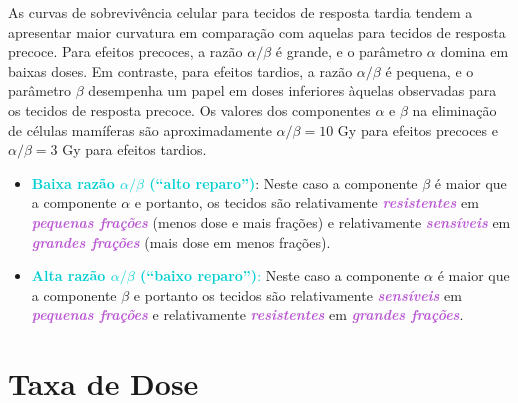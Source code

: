 \documentclass[11pt,a4paper]{article}
\begin{document}
	As curvas de sobrevivência celular para tecidos de resposta tardia tendem a apresentar maior curvatura em comparação com aquelas para tecidos de resposta precoce. Para efeitos precoces, a razão $\alpha/\beta$ é grande, e o parâmetro $\alpha$ domina em baixas doses. Em contraste, para efeitos tardios, a razão $\alpha/\beta$ é pequena, e o parâmetro $\beta$ desempenha um papel em doses inferiores àquelas observadas para os tecidos de resposta precoce. Os valores dos componentes $\alpha$ e $\beta$ na eliminação de células mamíferas são aproximadamente $\alpha/\beta = 10$ Gy para efeitos precoces e $\alpha/\beta = 3$ Gy para efeitos tardios.

	\begin{tcolorbox}[width=\textwidth, colback={white}, colbacktitle={DarkTurquoise!50!white}, title={$\bigstar$ \LobsterTwo{Observação} $\bigstar$}, coltitle={CarnationPink}, colframe={DarkTurquoise}, fonttitle=\rmfamily\bfseries\Large, breakable]

	\begin{itemize}
		\item \textcolor{DarkTurquoise}{\textbf{Baixa razão $\alpha/\beta$  (“alto reparo”)}}:  Neste caso a componente $\beta$ é maior que a componente $\alpha$ e portanto, os tecidos são relativamente \textcolor{MediumOrchid}{\textbf{\textit{resistentes}}} em \textcolor{MediumOrchid}{\textbf{\textit{pequenas frações}}} (menos dose e mais frações) e relativamente \textcolor{MediumOrchid}{\textbf{\textit{sensíveis}}} em \textcolor{MediumOrchid}{\textbf{\textit{grandes frações}}} (mais dose em menos frações). 
		\item \textcolor{DarkTurquoise}{\textbf{Alta razão $\alpha/\beta$ (“baixo reparo”)}:} Neste caso a componente $\alpha$ é maior que a componente $\beta$ e portanto os tecidos são relativamente \textcolor{MediumOrchid}{\textbf{\textit{sensíveis}}} em \textcolor{MediumOrchid}{\textbf{\textit{pequenas frações}}} e relativamente \textcolor{MediumOrchid}{\textbf{\textit{resistentes}}} em \textcolor{MediumOrchid}{\textbf{\textit{grandes frações}}}.
	\end{itemize}
	\end{tcolorbox}
	


\section{Taxa de Dose}
\end{document}
